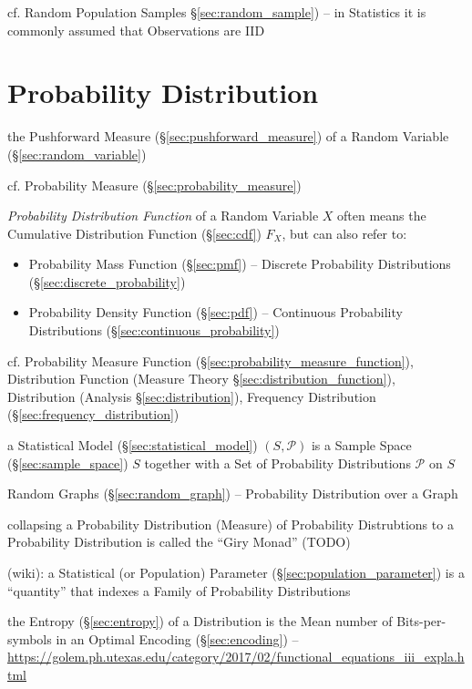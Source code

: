 cf. Random Population Samples \S\ref{sec:random_sample}) -- in Statistics it is
commonly assumed that Observations are IID



\section{Probability Distribution}\label{sec:probability_distribution}

the Pushforward Measure (\S\ref{sec:pushforward_measure}) of a Random Variable
(\S\ref{sec:random_variable})

cf. Probability Measure (\S\ref{sec:probability_measure})

\emph{Probability Distribution Function} of a Random Variable $X$ often means
the Cumulative Distribution Function (\S\ref{sec:cdf}) $F_X$, but can also refer
to:
\begin{itemize}
  \item Probability Mass Function (\S\ref{sec:pmf}) -- Discrete Probability
    Distributions (\S\ref{sec:discrete_probability})
  \item Probability Density Function (\S\ref{sec:pdf}) -- Continuous Probability
    Distributions (\S\ref{sec:continuous_probability})
\end{itemize}

\fist cf. Probability Measure Function
(\S\ref{sec:probability_measure_function}), Distribution Function (Measure
Theory \S\ref{sec:distribution_function}), Distribution (Analysis
\S\ref{sec:distribution}), Frequency Distribution
(\S\ref{sec:frequency_distribution})

a Statistical Model (\S\ref{sec:statistical_model}) $(S,\mathcal{P})$ is a
Sample Space (\S\ref{sec:sample_space}) $S$ together with a Set of Probability
Distributions $\mathcal{P}$ on $S$

\fist Random Graphs (\S\ref{sec:random_graph}) -- Probability Distribution over
a Graph

collapsing a Probability Distribution (Measure) of Probability Distrubtions to a
Probability Distribution is called the ``Giry Monad'' (TODO)

(wiki): a Statistical (or Population) Parameter
(\S\ref{sec:population_parameter}) is a ``quantity'' that indexes a Family of
Probability Distributions

the Entropy (\S\ref{sec:entropy}) of a Distribution is the Mean number
of Bits-per-symbols in an Optimal Encoding (\S\ref{sec:encoding}) --
\url{https://golem.ph.utexas.edu/category/2017/02/functional_equations_iii_expla.html}

